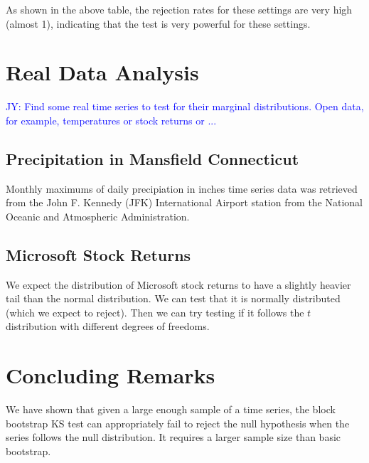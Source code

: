 \documentclass[12pt, letterpaper]{article}
\newcommand{\jy}[1]{\textcolor{blue}{JY: #1}}
\newcommand{\mc}[1]{\textcolor{green}{MC: (#1)}}
\begin{document}


As shown in the above table, the rejection rates for these settings are very 
high (almost 1), indicating that the test is very powerful for these settings.

\section{Real Data Analysis}

\jy{Find some real time series to test for their marginal distributions. Open
  data, for example, temperatures or stock returns or ...}

\subsection{Precipitation in Mansfield Connecticut}
Monthly maximums of daily precipiation in inches time series data was retrieved 
from the John F. Kennedy (JFK) International Airport station from the 
National Oceanic and Atmospheric Administration.

\subsection{Microsoft Stock Returns}


We expect the distribution of Microsoft stock returns to have a slightly
heavier tail than the normal distribution. We can test that it is normally
distributed (which we expect to reject). Then we can try testing if it follows
the $t$ distribution with different degrees of freedoms.


\section{Concluding Remarks}
\label{sec:conclusion}

We have shown that given a large enough sample of a time series, the block 
bootstrap KS test can appropriately fail to reject the null hypothesis when the
series follows the null distribution. It requires a larger sample size than 
basic bootstrap.







\end{document}
